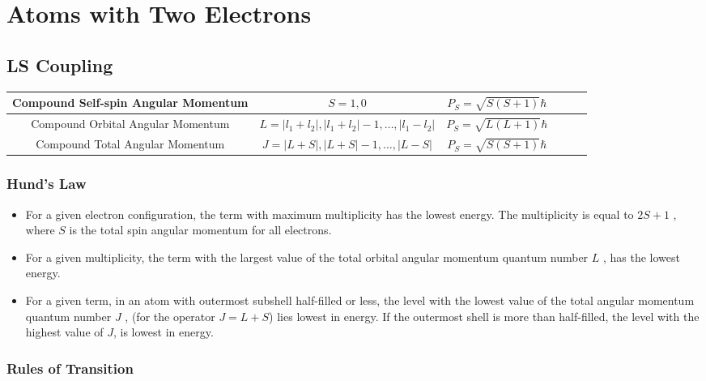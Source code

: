 \chapter{Atoms with Two Electrons}

\section{LS Coupling}

\begin{table*}[h]
  \centering
  \begin{tabular}{|Sc|Sc|Sc|}
    \hline
    Compound Self-spin Angular Momentum & $S = 1,0$ & $P_S = \sqrt{S \left( S + 1 \right)} \hbar$  \\
    \hline
    Compound Orbital Angular Momentum & $L = | l_1 + l_2 |, | l_1 + l_2 | - 1, \dots ,|l_1 - l_2|$ & $P_S = \sqrt{L \left( L + 1 \right)} \hbar$  \\
    \hline
    Compound Total Angular Momentum & $J = | L + S |, | L + S | - 1, \dots ,|L - S |$ & $P_S = \sqrt{S \left( S + 1 \right)} \hbar$  \\
    \hline
  \end{tabular}
\end{table*}

\subsection{Hund's Law}

\begin{itemize}
\item For a given electron configuration, the term with maximum multiplicity has the lowest energy. The multiplicity is equal to $2S+1$ , where $S$ is the total spin angular momentum for all electrons.
\item For a given multiplicity, the term with the largest value of the total orbital angular momentum quantum number  $L$ ,  has the lowest energy.

\item For a given term, in an atom with outermost subshell half-filled or less, the level with the lowest value of the total angular momentum quantum number $J$ , (for the operator $J = L + S$) lies lowest in energy. If the outermost shell is more than half-filled, the level with the highest value of $J$, is lowest in energy.
\end{itemize}

\subsection{Rules of Transition}

